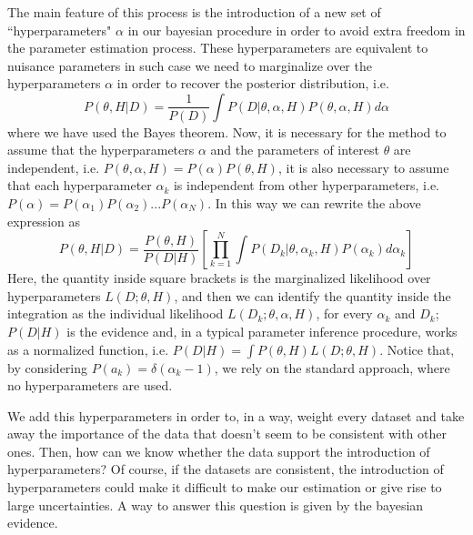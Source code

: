 \documentclass[onecolumn,           %
               showpacs,            %
               preprintnumbers,     %
               aps,                 %
               prl,          	    %
               letterpaper,             %
               superscriptaddress,      %
               nofootinbib,         %
               tightenlines,        %
               floats,floatfix      %
               ,usenatbib,
               ]{revtex4-1}
\begin{document}
The main feature of this process is the introduction of a new set of ``hyperparameters" $\alpha$ in our bayesian procedure in order to avoid extra freedom in the parameter estimation process.  These hyperparameters are equivalent to nuisance parameters in such case we need to marginalize over the hyperparameters $\alpha$ in order to recover the posterior distribution, i.e.
\begin{equation}
P(\theta,H|D)=\frac{1}{P(D)}\int P(D|\theta,\alpha,H)P(\theta,\alpha,H)d\alpha
\end{equation}
where we have used the Bayes theorem. Now, it is necessary for the method to assume that the hyperparameters $\alpha$ and the parameters of interest $\theta$ are independent, i.e. $P(\theta,\alpha,H)=P(\alpha)P(\theta,H)$, it is also necessary to assume that each hyperparameter $\alpha_k$ is independent from other hyperparameters, i.e. $P(\alpha)=P(\alpha_1)P(\alpha_2)...P(\alpha_N)$. In this way we can rewrite the above expression as
\begin{equation}
P(\theta,H|D)=\frac{P(\theta,H)}{P(D|H)}\left[\prod_{k=1}^N\int P(D_k|\theta,\alpha_k,H)P(\alpha_k)d\alpha_k\right]
\end{equation}
Here, the quantity inside square brackets is the marginalized likelihood over hyperparameters $L(D;\theta,H)$, and then we can identify the quantity inside the integration as the individual likelihood $L(D_k;\theta,\alpha,H)$, for every $\alpha_k$ and $D_k$; $P(D|H)$ is the evidence and, in a typical parameter inference procedure, works as a normalized function, i.e. $P(D|H)=\int P(\theta,H)L(D;\theta,H)$. Notice that, by considering $P(a_k)=\delta(\alpha_k-1)$, we rely on the standard approach, where no hyperparameters are used.  

We add this hyperparameters in order to, in a way, weight every dataset and take away the importance of the data that doesn't seem to be consistent with other ones. Then, how can we know whether the data support the introduction of hyperparameters? Of course, if the datasets are consistent, the introduction of hyperparameters could make it difficult to make our estimation or give rise to large uncertainties. A way to answer this question is given by the bayesian evidence.
\end{document}
